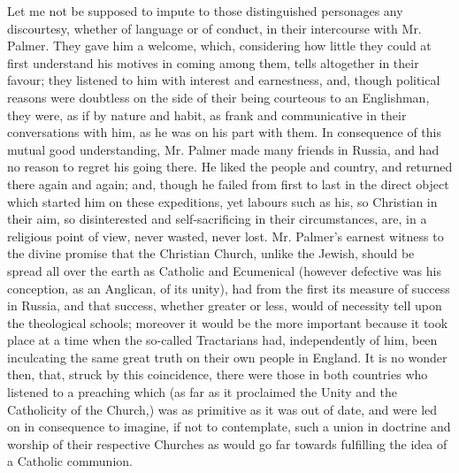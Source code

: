 Let me not be supposed to impute to those
distinguished personages any discourtesy, whether of language or of
conduct, in their intercourse with Mr. Palmer. They gave him a
welcome, which, considering how little they could at first understand
his motives in coming among them, tells altogether in their favour;
they listened to him with interest and earnestness, and, though
political reasons were doubtless on the side of their being courteous
to an Englishman, they were, as if by nature and habit, as frank
and communicative in their conversations with him, as he was on his
part with them. In consequence of this mutual good understanding, Mr.
Palmer made many friends in Russia, and had no reason to regret his
going there. He liked the people and country, and returned there again
and again; and, though he failed from first to last in the direct
object which started him on these expeditions, yet labours such as
his, so Christian in their aim, so disinterested and self-sacrificing
in their circumstances, are, in a religious point of view, never
wasted, never lost. Mr. Palmer's earnest witness to the divine promise
that the Christian Church, unlike the Jewish, should be spread all
over the earth as Catholic and Ecumenical (however defective was his
conception, as an Anglican, of its unity), had from the first its
measure of success in Russia, and that success, whether greater or
less, would of necessity tell upon the theological schools; moreover it would be the more important because it took place at a
time when the so-called Tractarians had, independently of him, been
inculcating the same great truth on their own people in England. It is
no wonder then, that, struck by this coincidence, there were those in
both countries who listened to a preaching which (as far as it
proclaimed the Unity and the Catholicity of the Church,) was as
primitive as it was out of date, and were led on in consequence to
imagine, if not to contemplate, such a union in doctrine and worship
of their respective Churches as would go far towards fulfilling the
idea of a Catholic communion.

